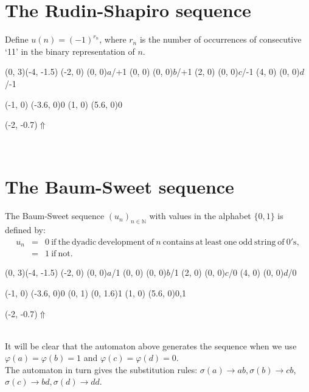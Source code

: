 \documentclass{article}
\begin{document}
\section*{The Rudin-Shapiro sequence}
Define $u(n) = (-1)^{r_n}$, where $r_n$ is the number of occurrences of
consecutive `11' in the binary representation of $n$.

\begin{graph}(0, 3)(-4, -1.5)
  (-2, 0) (0, 0){\bs$a$/+1\es}
  (0, 0)  (0, 0){\bs$b$/+1\es}
  (2, 0)  (0, 0){\bs$c$/-1\es}
  (4, 0)  (0, 0){\bs$d$/-1\es}

  (-1, 0) \freetext(-3.6, 0){0}
   
   
   
   
   
  (1, 0) \freetext(5.6, 0){0}
   

  \freetext(-2, -0.7){$\Uparrow$}
\end{graph}\\

\section*{The Baum-Sweet sequence}
The Baum-Sweet sequence $(u_n)_{n \in \mathbb{N}}$ with values in the alphabet
$\{0, 1\}$ is defined by:
\begin{eqnarray*}
u_n &=& 0 \mathrm{\ if\ the\ dyadic\ development\ of\ } n
          \mathrm{\ contains\ at\ least\ one\ odd\ string\ of\ 0's},\\
    &=& 1 \mathrm{\ if\ not.}
\end{eqnarray*}
\begin{graph}(0, 3)(-4, -1.5)
  (-2, 0) (0, 0){$a$/1}
  (0, 0)  (0, 0){$b$/1}
  (2, 0)  (0, 0){$c$/0}
  (4, 0)  (0, 0){$d$/0}

  (-1, 0) \freetext(-3.6, 0){0}
   
   
  (0, 1) \freetext(0, 1.6){1}
   
   
  (1, 0) \freetext(5.6, 0){0,1}

  \freetext(-2, -0.7){$\Uparrow$}
\end{graph}\\
It will be clear that the automaton above generates the sequence when we use
$\varphi(a) = \varphi(b) = 1$ and $\varphi(c) = \varphi(d) = 0$.\\
The automaton in turn gives the substitution rules:
$\sigma(a) \rightarrow ab, \sigma(b) \rightarrow cb$,
$\sigma(c) \rightarrow bd, \sigma(d) \rightarrow dd$.
\end{document}
